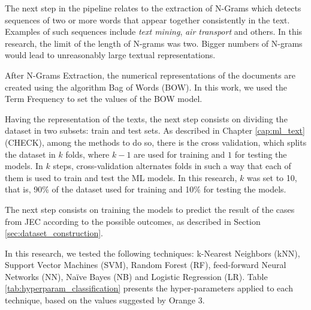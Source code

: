 The next step in the pipeline relates to the extraction of N-Grams which detects sequences of two or more words that appear together consistently in the text. Examples of such sequences include \textit{text mining}, \textit{air transport} and others. In this research, the limit of the length of N-grams was two. Bigger numbers of N-grams would lead to unreasonably large textual representations.




After N-Grams Extraction, the numerical representations of the documents are created using the algorithm Bag of Words (BOW). In this work, we used the Term Frequency to set the values of the BOW model. 


Having the representation of the texts, the next step consists on dividing the dataset in two subsets: train and test sets. As described in Chapter \ref{cap:ml_text} (CHECK), among the methods to do so, there is the cross validation, which splits the dataset in $k$ folds, where $k-1$ are used for training and $1$ for testing the models. In $k$ steps, cross-validation alternates folds in such a way that each of them is used to train and test the ML models. In this research, $k$ was set to 10, that is, 90\% of the dataset used for training and 10\% for testing the models.

The next step consists on training the models to predict the result of the cases from JEC according to the possible outcomes, as described in Section \ref{sec:dataset_construction}. 

In this research, we tested the following techniques: k-Nearest Neighbors (kNN), Support Vector Machines (SVM), Random Forest (RF), feed-forward Neural Networks (NN), Naïve Bayes (NB) and Logistic Regression (LR). Table \ref{tab:hyperparam_classification} presents the hyper-parameters applied to each technique, based on the values suggested by Orange 3.


